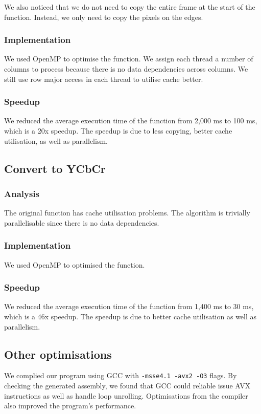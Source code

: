\documentclass[a4paper]{article}
\begin{document}
We also noticed that we do not need to copy the entire frame at the
start of the function. Instead, we only need to copy the pixels on the
edges.

\subsubsection{Implementation}
We used OpenMP to optimise the function. We assign each thread a
number of columns to process because there is no data dependencies
across columns. We still use row major access in each thread to
utilise cache better.


\subsubsection{Speedup}
We reduced the average execution time of the function from 2,000 ms to
100 ms, which is a 20x speedup. The speedup is due to less copying,
better cache utilisation, as well as parallelism.

\subsection{Convert to YCbCr}
\subsubsection{Analysis}
The original function has cache utilisation problems. The algorithm is
trivially parallelisable since there is no data dependencies.

\subsubsection{Implementation}
We used OpenMP to optimised the function.


\subsubsection{Speedup}
We reduced the average execution time of the function from 1,400 ms to
30 ms, which is a 46x speedup. The speedup is due to better cache
utilisation as well as parallelism.

\subsection{Other optimisations}
We complied our program using GCC with \verb|-msse4.1 -avx2 -O3|
flags. By checking the generated assembly, we found that GCC could
reliable issue AVX instructions as well as handle loop unrolling.
Optimisations from the compiler also improved the program's performance.
\end{document}

